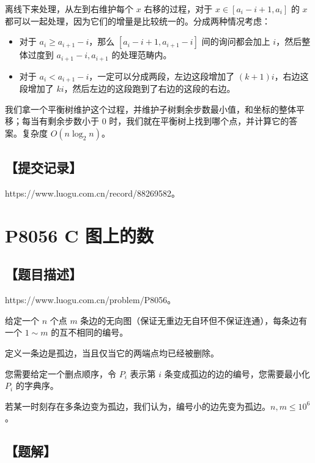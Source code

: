 \documentclass[UTF8,12pt,a4paper]{ctexart}
\begin{document}
	离线下来处理，从左到右维护每个 $x$ 右移的过程，对于 $x\in[a_i-i+1,a_i]$ 的 $x$ 都可以一起处理，因为它们的增量是比较统一的。分成两种情况考虑：
	
	\begin{itemize}
		\item 对于 $a_i\ge a_{i+1}-i$，那么 $[a_i-i+1,a_{i+1}-i]$ 间的询问都会加上 $i$，然后整体过度到 $a_{i+1}-i,a_{i+1}$ 的处理范畴内。
		\item 对于 $a_i<a_{i+1}-i$，一定可以分成两段，左边这段增加了 $(k+1)i$，右边这段增加了 $ki$，然后左边的这段跑到了右边的这段的右边。
	\end{itemize}

	我们拿一个平衡树维护这个过程，并维护子树剩余步数最小值，和坐标的整体平移；每当有剩余步数小于 $0$ 时，我们就在平衡树上找到哪个点，并计算它的答案。复杂度 $O(n\log_2n)$。
	
	\subsection*{【提交记录】}
	
	https://www.luogu.com.cn/record/88269582。
	
	
	\section*{P8056 C 图上的数}
	
	\subsection*{【题目描述】}
	
	https://www.luogu.com.cn/problem/P8056。
	
	给定一个 $n$ 个点 $m$ 条边的无向图（保证无重边无自环但不保证连通），每条边有一个 $1\sim m$ 的互不相同的编号。
	
	定义一条边是孤边，当且仅当它的两端点均已经被删除。
	
	您需要给定一个删点顺序，令 $P_i$ 表示第 $i$ 条变成孤边的边的编号，您需要最小化 $P_i$ 的字典序。
	
	若某一时刻存在多条边变为孤边，我们认为，编号小的边先变为孤边。$n,m\le 10^6$。
	
	\subsection*{【题解】}
	
\end{document}
